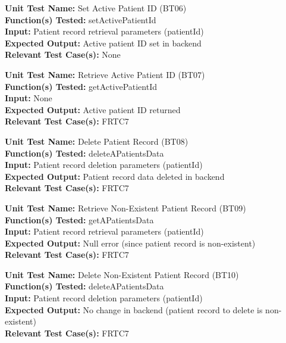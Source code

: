 \documentclass[12pt, titlepage]{article}
\begin{document}
\begin{mdframed}[linewidth=0.5mm]
  \textbf{Unit Test Name:} Set Active Patient ID (BT06) \\
  \textbf{Function(s) Tested:} setActivePatientId \\
  \textbf{Input:} Patient record retrieval parameters (patientId) \\
  \textbf{Expected Output:} Active patient ID set in backend \\
  \textbf{Relevant Test Case(s):} None
\end{mdframed}

\begin{mdframed}[linewidth=0.5mm]
  \textbf{Unit Test Name:} Retrieve Active Patient ID (BT07) \\
  \textbf{Function(s) Tested:} getActivePatientId \\
  \textbf{Input:} None \\
  \textbf{Expected Output:} Active patient ID returned \\
  \textbf{Relevant Test Case(s):} FRTC7
\end{mdframed}

\begin{mdframed}[linewidth=0.5mm]
  \textbf{Unit Test Name:} Delete Patient Record (BT08) \\
  \textbf{Function(s) Tested:} deleteAPatientsData \\
  \textbf{Input:} Patient record deletion parameters (patientId) \\
  \textbf{Expected Output:} Patient record data deleted in backend \\
  \textbf{Relevant Test Case(s):} FRTC7
\end{mdframed}

\begin{mdframed}[linewidth=0.5mm]
  \textbf{Unit Test Name:} Retrieve Non-Existent Patient Record (BT09) \\
  \textbf{Function(s) Tested:} getAPatientsData \\
  \textbf{Input:} Patient record retrieval parameters (patientId) \\
  \textbf{Expected Output:} Null error (since patient record is non-existent) \\
  \textbf{Relevant Test Case(s):} FRTC7
\end{mdframed}

\begin{mdframed}[linewidth=0.5mm]
  \textbf{Unit Test Name:} Delete Non-Existent Patient Record (BT10) \\
  \textbf{Function(s) Tested:} deleteAPatientsData \\
  \textbf{Input:} Patient record deletion parameters (patientId) \\
  \textbf{Expected Output:} No change in backend (patient record to delete is non-existent) \\
  \textbf{Relevant Test Case(s):} FRTC7
\end{mdframed}
\end{document}
